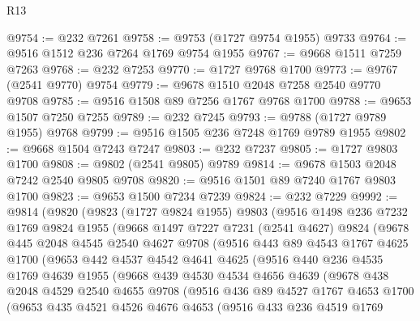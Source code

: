 \begin{lexlean}{R13}
\begin{coremodule}
@9754 := @232 @7261
@9758 := @9753 (@1727 @9754 @1955) @9733
@9764 := @9516 @1512 @236 @7264 @1769 @9754 @1955
@9767 := @9668 @1511 @7259 @7263
@9768 := @232 @7253
@9770 := @1727 @9768 @1700
@9773 := @9767 (@2541 @9770) @9754
@9779 := @9678 @1510 @2048 @7258 @2540 @9770 @9708
@9785 := @9516 @1508 @89 @7256 @1767 @9768 @1700
@9788 := @9653 @1507 @7250 @7255
@9789 := @232 @7245
@9793 := @9788 (@1727 @9789 @1955) @9768
@9799 := @9516 @1505 @236 @7248 @1769 @9789 @1955
@9802 := @9668 @1504 @7243 @7247
@9803 := @232 @7237
@9805 := @1727 @9803 @1700
@9808 := @9802 (@2541 @9805) @9789
@9814 := @9678 @1503 @2048 @7242 @2540 @9805 @9708
@9820 := @9516 @1501 @89 @7240 @1767 @9803 @1700
@9823 := @9653 @1500 @7234 @7239
@9824 := @232 @7229
@9992 := @9814
    (@9820
      (@9823
        (@1727 @9824 @1955)
        @9803
        (@9516
          @1498
          @236
          @7232
          @1769
          @9824
          @1955
          (@9668
            @1497
            @7227
            @7231
            (@2541 @4627)
            @9824
            (@9678
              @445
              @2048
              @4545
              @2540
              @4627
              @9708
              (@9516
                @443
                @89
                @4543
                @1767
                @4625
                @1700
                (@9653
                  @442
                  @4537
                  @4542
                  @4641
                  @4625
                  (@9516
                    @440
                    @236
                    @4535
                    @1769
                    @4639
                    @1955
                    (@9668
                      @439
                      @4530
                      @4534
                      @4656
                      @4639
                      (@9678
                        @438
                        @2048
                        @4529
                        @2540
                        @4655
                        @9708
                        (@9516
                          @436
                          @89
                          @4527
                          @1767
                          @4653
                          @1700
                          (@9653
                            @435
                            @4521
                            @4526
                            @4676
                            @4653
                            (@9516
                              @433
                              @236
                              @4519
                              @1769

\end{coremodule}
\end{lexlean}
